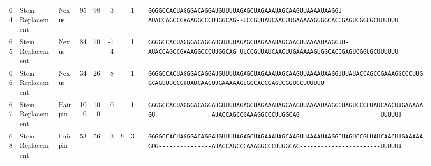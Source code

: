 \begin{tabular}{rllrrrrrcl}
 64 & Stem Replacement & Nexus & 95 & 98 & 3 &  & 1 &  &
 \color{ucsfdarkgrey}\verb|GGGGCCACUAGGGACAGGAU|\color{ucsforange}\verb|GUUUUA|\color{ucsfblue}\verb|GAGCUAGAAAUAGCAAGU|\color{ucsforange}\verb|UAAAAUAA|\color{ucsfnavy}\verb|GGU--|\color{ucsfpurple}\verb|AUACCAGCCGAAAGGCCCUUGGCAG|\color{ucsfnavy}\verb|--UCCGU|\color{ucsforange}\verb|UAUCA|\color{ucsfteal}\verb|ACUUGAAAAAGU|\color{ucsforange}\verb|GGCACCGAGUCGGUGCUUUUUU| \\

 65 & Stem Replacement & Nexus & 84 & 70 & -14 &  & 1 &  &
 \color{ucsfdarkgrey}\verb|GGGGCCACUAGGGACAGGAU|\color{ucsforange}\verb|GUUUUA|\color{ucsfblue}\verb|GAGCUAGAAAUAGCAAGU|\color{ucsforange}\verb|UAAAAUAA|\color{ucsfnavy}\verb|GGUU-|\color{ucsfpurple}\verb|AUACCAGCCGAAAGGCCCUUGGCAG|\color{ucsfnavy}\verb|-UUCCGU|\color{ucsforange}\verb|UAUCA|\color{ucsfteal}\verb|ACUUGAAAAAGU|\color{ucsforange}\verb|GGCACCGAGUCGGUGCUUUUUU| \\

 66 & Stem Replacement & Nexus & 34 & 26 & -8 &  & 1 &  &
 \color{ucsfdarkgrey}\verb|GGGGCCACUAGGGACAGGAU|\color{ucsforange}\verb|GUUUUA|\color{ucsfblue}\verb|GAGCUAGAAAUAGCAAGU|\color{ucsforange}\verb|UAAAAUAA|\color{ucsfnavy}\verb|GGUUU|\color{ucsfpurple}\verb|AUACCAGCCGAAAGGCCCUUGGCAG|\color{ucsfnavy}\verb|UUUCCGU|\color{ucsforange}\verb|UAUCA|\color{ucsfteal}\verb|ACUUGAAAAAGU|\color{ucsforange}\verb|GGCACCGAGUCGGUGCUUUUUU| \\

 67 & Stem Replacement & Hairpin & 100 & 100 & 0 &  & 1 &  &
 \color{ucsfdarkgrey}\verb|GGGGCCACUAGGGACAGGAU|\color{ucsforange}\verb|GUUUUA|\color{ucsfblue}\verb|GAGCUAGAAAUAGCAAGU|\color{ucsforange}\verb|UAAAAUAA|\color{ucsfnavy}\verb|GGCUAGUCCGU|\color{ucsforange}\verb|UAUCA|\color{ucsfteal}\verb|ACUUGAAAAAGU-|\color{ucsforange}\verb|---------------|\color{ucsfpurple}\verb|AUACCAGCCGAAAGGCCCUUGGCAG|\color{ucsforange}\verb|-----------------------UUUUUU| \\

 68 & Stem Replacement & Hairpin & 53 & 56 & 3 & 9 & 3 &  &
 \color{ucsfdarkgrey}\verb|GGGGCCACUAGGGACAGGAU|\color{ucsforange}\verb|GUUUUA|\color{ucsfblue}\verb|GAGCUAGAAAUAGCAAGU|\color{ucsforange}\verb|UAAAAUAA|\color{ucsfnavy}\verb|GGCUAGUCCGU|\color{ucsforange}\verb|UAUCA|\color{ucsfteal}\verb|ACUUGAAAAAGUG|\color{ucsforange}\verb|---------------|\color{ucsfpurple}\verb|AUACCAGCCGAAAGGCCCUUGGCAG|\color{ucsforange}\verb|-----------------------UUUUUU| \\


\end{tabular}
